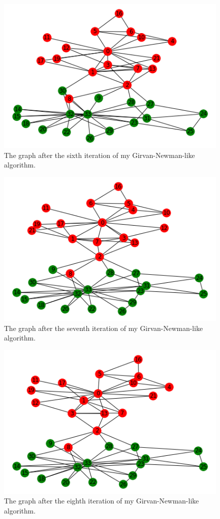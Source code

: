 \documentclass[12pt]{article}
\begin{document}
\pagebreak

\begin{figure}[h]
    \centering
    \includegraphics{iteration6.png}
    \caption{The graph after the sixth iteration of my Girvan-Newman-like algorithm.}
    \label{fig:iteration6}
\end{figure}

\pagebreak

\begin{figure}[h]
    \centering
    \includegraphics{iteration7.png}
    \caption{The graph after the seventh iteration of my Girvan-Newman-like algorithm.}
    \label{fig:iteration7}
\end{figure}

\pagebreak

\begin{figure}[h]
    \centering
    \includegraphics{iteration8.png}
    \caption{The graph after the eighth iteration of my Girvan-Newman-like algorithm.}
    \label{fig:iteration8}
\end{figure}
\end{document}
